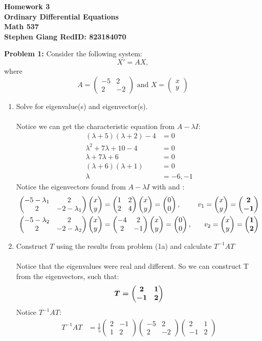 \documentclass[11pt]{article}
\newcommand{\cvec}[2]{\begin{pmatrix} #1 \\ #2 \end{pmatrix}}
\newcommand{\smat}[4]{\begin{pmatrix} #1 & #2 \\ #3 & #4 \end{pmatrix}}
\newcommand{\bmath}[1]{\text{\boldmath#1\unboldmath}}
\newcommand{\skipline}{\vspace{\baselineskip}}
\newenvironment{problem}[1]{\textbf{Problem #1: }}{\newpage}
\begin{document}
	
	\begin{center}
		\textbf{Homework 3} \\
		\textbf{Ordinary Differential Equations} \\
		\textbf{Math 537} \\
		\textbf{Stephen Giang RedID: 823184070} \\
		\skipline \skipline
	\end{center}

	\begin{problem}{1}
		Consider the following system:
		\[X' = AX, \tag{1.1}\]
		where 
		\[A = \smat{-5}{2}{2}{-2} \text{ and } X = \cvec{x}{y}\]
		\skipline 
		\begin{enumerate}[label = (\alph*)]
			\item  Solve for eigenvalue(s) and eigenvector(s).
			\\ \\
			Notice we can get the characteristic equation from $A - \lambda I$:
			\begin{align*}
				(\lambda + 5)(\lambda  + 2) - 4 &= 0 \\
				\lambda^2 + 7\lambda + 10 - 4 &= 0 \\
				\lambda + 7\lambda + 6 &= 0 \\
				(\lambda + 6)(\lambda + 1) &= 0 \\
				\lambda &= -6, -1
			\end{align*}
			Notice the eigenvectors found from $A - \lambda I$ with \bmath{$\lambda_1 = -6$} and \bmath{$\lambda_2 = -1$}: \\
			\begin{align*}
				\smat{-5 - \lambda_1}{2}{2}{-2 - \lambda_1}\cvec{x}{y} &= \smat{1}{2}{2}{4}\cvec{x}{y} = \cvec{0}{0}, & v_1 = \cvec{x}{y} = \bmath{$\cvec{2}{-1}$} \\
				\smat{-5 - \lambda_2}{2}{2}{-2 - \lambda_2}\cvec{x}{y} &= \smat{-4}{2}{2}{-1}\cvec{x}{y} = \cvec{0}{0}, & v_2 = \cvec{x}{y} = \bmath{$\cvec{1}{2}$}
			\end{align*}
			\item  Construct $T$ using the results from problem (1a) and calculate $T^{-1}AT$
			\\ \\
			Notice that the eigenvalues were real and different.  So we can construct T from the eigenvectors, such that:
			\[\bmath{$T = \smat{2}{1}{-1}{2}$}\]
			Notice $T^{-1}AT$:
			\begin{align*}
				T^{-1}AT &= \frac{1}{5}\smat{2}{-1}{1}{2}\smat{-5}{2}{2}{-2}\smat{2}{1}{-1}{2} \\

\end{align*}
\end{enumerate}
\end{problem}
\end{document}
